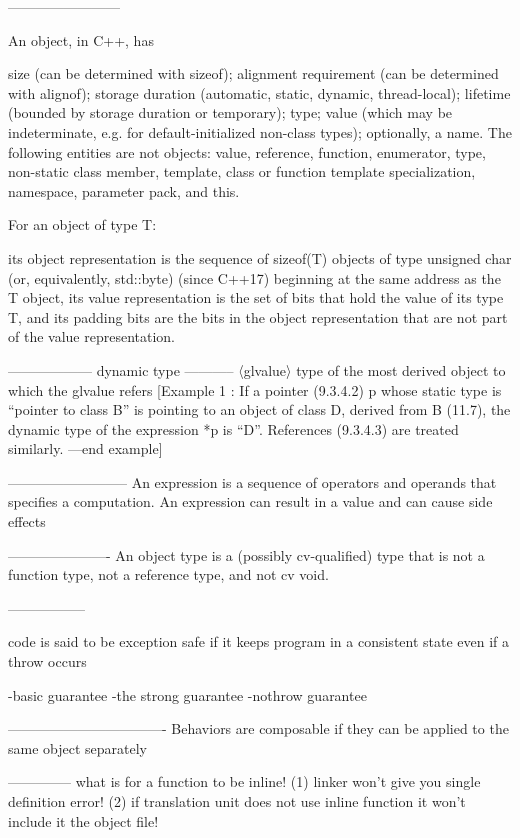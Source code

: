 ------------------------

An object, in C++, has

size (can be determined with sizeof);
alignment requirement (can be determined with alignof);
storage duration (automatic, static, dynamic, thread-local);
lifetime (bounded by storage duration or temporary);
type;
value (which may be indeterminate, e.g. for default-initialized non-class types);
optionally, a name.
The following entities are not objects: value, reference, function, enumerator, type, non-static class member, template, class or function template specialization, namespace, parameter pack, and this.

For an object of type T:

its object representation is the sequence of sizeof(T) objects of type unsigned char (or, equivalently, std::byte) (since C++17) beginning at the same address as the T object,
its value representation is the set of bits that hold the value of its type T, and
its padding bits are the bits in the object representation that are not part of the value representation.


------------------
dynamic type
-----------
〈glvalue〉 type of the most derived object to which the glvalue refers
[Example 1 : If a pointer (9.3.4.2) p whose static type is “pointer to class B” is pointing to an object of class D, derived
from B (11.7), the dynamic type of the expression *p is “D”. References (9.3.4.3) are treated similarly. —end example]

--------------------------
An expression is a sequence of operators and operands that specifies a computation. An expression can result in a value and can cause side effects

----------------------
An object type is a (possibly cv-qualified) type that is not a function type, not a reference type, and not cv void.

-----------------


code is said to be exception safe if it keeps program in a consistent state even if a throw occurs

-basic guarantee
-the strong guarantee
-nothrow guarantee

----------------------------------
Behaviors are composable if they can be applied to the same object separately

--------------
what is for a function to be inline!
(1) linker won't give you single definition error!
(2) if translation unit does not use inline function it won't include it the object file!


